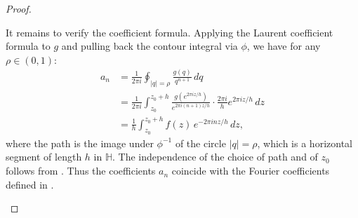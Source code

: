 \begin{proof}
\begin{enumerate}
  It remains to verify the coefficient formula. Applying the Laurent coefficient formula to $g$ and pulling back the contour integral via $\phi$, we have for any $\rho \in (0, 1)$:
  \begin{align*}
    a_n &= \frac{1}{2\pi i} \oint_{|q| = \rho} \frac{g(q)}{q^{n+1}} \, dq \\
        &= \frac{1}{2\pi i} \int_{z_0}^{z_0 + h} \frac{g(e^{2\pi i z / h})}{e^{2\pi i (n+1) z / h}} \cdot \frac{2\pi i}{h} e^{2\pi i z / h} \, dz \\
        &= \frac{1}{h} \int_{z_0}^{z_0 + h} f(z) \, e^{-2\pi i n z / h} \, dz,
  \end{align*}
  where the path is the image under $\phi^{-1}$ of the circle $|q| = \rho$, which is a horizontal segment of length $h$ in $\mathbb{H}$. The independence of the choice of path and of $z_0$ follows from . Thus the coefficients $a_n$ coincide with the Fourier coefficients defined in .
\end{enumerate}
\end{proof}